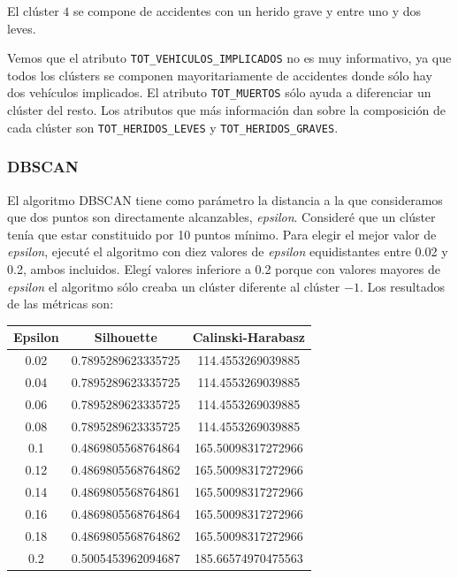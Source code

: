 \documentclass[a4]{article}
\begin{document}
El clúster $4$ se compone de accidentes con un herido grave y entre uno y dos leves.

Vemos que el atributo \texttt{TOT\_VEHICULOS\_IMPLICADOS} no es muy informativo, ya que todos los clústers se componen mayoritariamente de accidentes donde sólo hay dos vehículos implicados. El atributo \texttt{TOT\_MUERTOS} sólo ayuda a diferenciar un clúster del resto. Los atributos que más información dan sobre la composición de cada clúster son \texttt{TOT\_HERIDOS\_LEVES} y \texttt{TOT\_HERIDOS\_GRAVES}.

\subsubsection{DBSCAN}

El algoritmo DBSCAN tiene como parámetro la distancia a la que consideramos que dos puntos son directamente alcanzables, \textit{epsilon}. Consideré que un clúster tenía que estar constituido por 10 puntos mínimo. Para elegir el mejor valor de \textit{epsilon}, ejecuté el algoritmo con diez valores de \textit{epsilon} equidistantes entre 0.02 y 0.2, ambos incluidos. Elegí valores inferiore a 0.2 porque con valores mayores de \textit{epsilon} el algoritmo sólo creaba un clúster diferente al clúster $-1$.  Los resultados de las métricas son:

\begin{center}
\begin{tabular}{|c|c|c|}
\hline
\multicolumn{1}{|c|}{\textbf{Epsilon}}& \textbf{Silhouette} & \textbf{Calinski-Harabasz}\\ \hline
  0.02  & 0.7895289623335725  & 114.4553269039885  \\ \hline
  0.04  & 0.7895289623335725  & 114.4553269039885  \\ \hline
  0.06  & 0.7895289623335725  & 114.4553269039885  \\ \hline
  0.08  & 0.7895289623335725  & 114.4553269039885  \\ \hline
  0.1   & 0.4869805568764864  & 165.50098317272966  \\ \hline
  0.12  & 0.4869805568764862  & 165.50098317272966  \\ \hline
  0.14  & 0.4869805568764861  & 165.50098317272966  \\ \hline
  0.16  & 0.4869805568764864  & 165.50098317272966  \\ \hline
  0.18  & 0.4869805568764862  & 165.50098317272966  \\ \hline
  0.2   & 0.5005453962094687  & 185.66574970475563  \\ \hline
\end{tabular}
\end{center}
\end{document}

